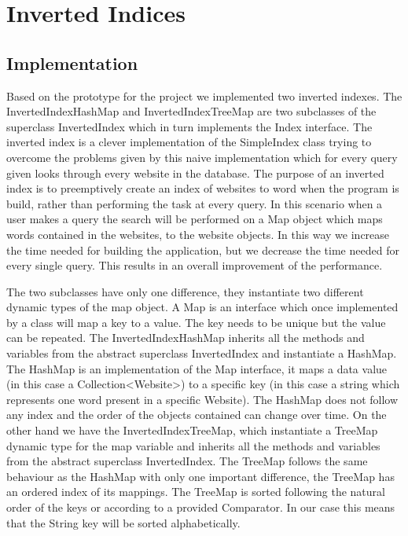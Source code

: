 \section{Inverted Indices}

\subsection{Implementation}
Based on the prototype for the project we implemented two inverted indexes. The InvertedIndexHashMap and InvertedIndexTreeMap are two subclasses of the superclass InvertedIndex which in turn implements the Index interface. The inverted index is a clever implementation of the SimpleIndex class trying to overcome the problems given by this naive implementation which for every query given looks through every website in the database. The purpose of an inverted index is to preemptively create an index of websites to word when the program is build, rather than performing the task at every query. In this scenario when a user makes a query the search will be performed on a Map object which maps words contained in the websites, to the website objects. In this way we increase the time needed for building the application, but we decrease the time needed for every single query. This results in an overall improvement of the performance.

The two subclasses have only one difference, they instantiate two different dynamic types of the map object. A Map is an interface which once implemented by a class will map a key to a value. The key needs to be unique but the value can be repeated.
The InvertedIndexHashMap inherits all the methods and variables from the abstract superclass InvertedIndex and instantiate a HashMap. The HashMap is an implementation of the Map interface, it maps a data value (in this case a Collection<Website>) to a specific key (in this case a string which represents one word present in a specific Website). The HashMap does not follow any index and the order of the objects contained can change over time.
On the other hand we have the InvertedIndexTreeMap, which instantiate a TreeMap dynamic type for the map variable and inherits all the methods and variables from the abstract superclass InvertedIndex. The TreeMap follows the same behaviour as the HashMap with only one important difference, the TreeMap has an ordered index of its mappings. The TreeMap is sorted following the natural order of the keys or according to a provided Comparator. In our case this means that the String key will be sorted alphabetically.

